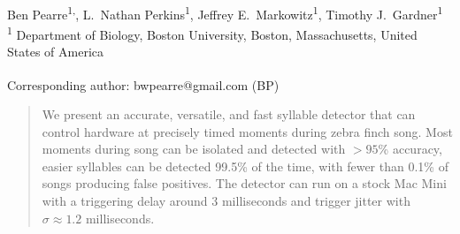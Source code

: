 \documentclass[10pt,letterpaper]{article}
\date{}
\begin{document}
\vspace*{0.35in}

\begin{flushleft}
{\Large
\textbf{}
}
\newline
\\
Ben Pearre\textsuperscript{1,\textcurrency},
L.~Nathan Perkins\textsuperscript{1},
Jeffrey E.~Markowitz\textsuperscript{1},
Timothy J.~Gardner\textsuperscript{1}
\\
\bigskip
\textsuperscript{1} Department of Biology, Boston University, Boston, Massachusetts, United States of America
\\
\bigskip

% 
%





\textsuperscript{\textcurrency} Corresponding author: bwpearre@gmail.com (BP)

\end{flushleft}

\reversemarginpar



\begin{abstract}
  We present an accurate, versatile, and fast syllable detector that
  can control hardware at precisely timed moments during zebra finch
  song. Most moments during song can be isolated and detected with
  $>95$\% accuracy, easier syllables can be detected 99.5\% of the time, with
  fewer than 0.1\% of songs producing false positives. The detector can run on a stock
  Mac Mini with a triggering delay around 3 milliseconds and trigger
  jitter with $\sigma\approx 1.2$ milliseconds.
\end{abstract}
\end{document}
